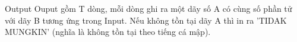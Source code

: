 Output  
Ouput gồm T dòng, mỗi dòng ghi ra một dãy số A có cùng số phần tử với dãy B tương ứng trong Input. Nếu không tồn tại dãy A thì in ra 'TIDAK MUNGKIN' (nghĩa là không tồn tại theo tiếng cá mập).